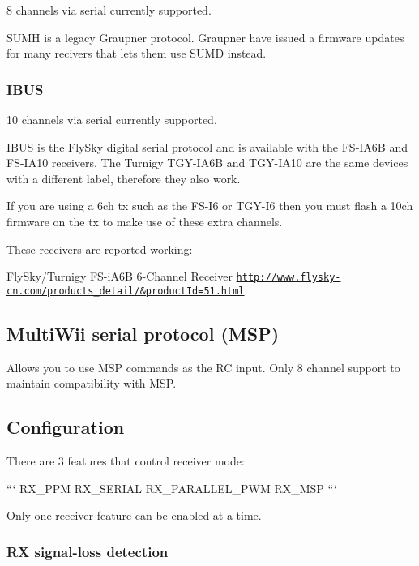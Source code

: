 8 channels via serial currently supported.

S\+U\+M\+H is a legacy Graupner protocol. Graupner have issued a firmware updates for many recivers that lets them use S\+U\+M\+D instead.

\subsubsection*{I\+B\+U\+S}

10 channels via serial currently supported.

I\+B\+U\+S is the Fly\+Sky digital serial protocol and is available with the F\+S-\/\+I\+A6\+B and F\+S-\/\+I\+A10 receivers. The Turnigy T\+G\+Y-\/\+I\+A6\+B and T\+G\+Y-\/\+I\+A10 are the same devices with a different label, therefore they also work.

If you are using a 6ch tx such as the F\+S-\/\+I6 or T\+G\+Y-\/\+I6 then you must flash a 10ch firmware on the tx to make use of these extra channels.

These receivers are reported working\+:

Fly\+Sky/\+Turnigy F\+S-\/i\+A6\+B 6-\/\+Channel Receiver \href{http://www.flysky-cn.com/products_detail/&productId=51.html}{\tt http\+://www.\+flysky-\/cn.\+com/products\+\_\+detail/\&product\+Id=51.\+html}

\subsection*{Multi\+Wii serial protocol (M\+S\+P)}

Allows you to use M\+S\+P commands as the R\+C input. Only 8 channel support to maintain compatibility with M\+S\+P.

\subsection*{Configuration}

There are 3 features that control receiver mode\+:

``` R\+X\+\_\+\+P\+P\+M R\+X\+\_\+\+S\+E\+R\+I\+A\+L R\+X\+\_\+\+P\+A\+R\+A\+L\+L\+E\+L\+\_\+\+P\+W\+M R\+X\+\_\+\+M\+S\+P ```

Only one receiver feature can be enabled at a time.

\subsubsection*{R\+X signal-\/loss detection}

